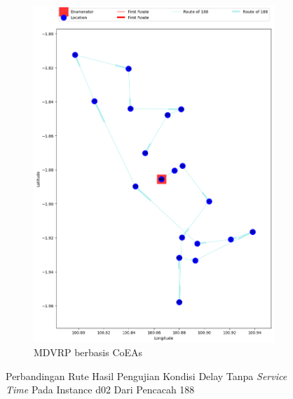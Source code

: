 \begin{figure}[H]
	\centering
	\begin{subfigure}[t]{\textwidth}
		\centering
		\includegraphics[width=\textwidth]{Resources/Images/delayed_2/real_m15_n100_delayed_2_188_coes}
		\caption{MDVRP berbasis CoEAs}
		\label{fig:real_m15_n100_delayed_2_188_coes}
	\end{subfigure}
	\caption{Perbandingan Rute Hasil Pengujian Kondisi Delay Tanpa \textit{Service Time} Pada Instance d02 Dari Pencacah 188}
	\label{fig:real_m15_n100_delayed_2_188}
\end{figure}


